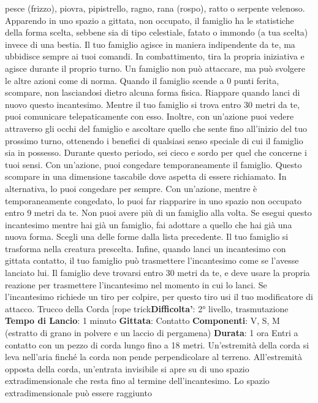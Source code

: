\begin{multicols}{2}
pesce (frizzo), piovra, pipistrello, ragno, rana (rospo),
ratto o serpente velenoso. Apparendo in uno spazio a
gittata, non occupato, il famiglio ha le statistiche della
forma scelta, sebbene sia di tipo celestiale, fatato o
immondo (a tua scelta) invece di una bestia.
Il tuo famiglio agisce in maniera indipendente da te, ma
ubbidisce sempre ai tuoi comandi. In combattimento,
tira la propria iniziativa e agisce durante il proprio turno.
Un famiglio non può attaccare, ma può svolgere le altre
azioni come di norma.
Quando il famiglio scende a 0 punti ferita, scompare,
non lasciandosi dietro alcuna forma fisica. Riappare
quando lanci di nuovo questo incantesimo.
Mentre il tuo famiglio si trova entro 30 metri da te, puoi
comunicare telepaticamente con esso. Inoltre, con
un’azione puoi vedere attraverso gli occhi del famiglio e
ascoltare quello che sente fino all’inizio del tuo
prossimo turno, ottenendo i benefici di qualsiasi senso
speciale di cui il famiglio sia in possesso. Durante
questo periodo, sei cieco e sordo per quel che
concerne i tuoi sensi.
Con un’azione, puoi congedare temporaneamente il
famiglio. Questo scompare in una dimensione tascabile
dove aspetta di essere richiamato. In alternativa, lo puoi
congedare per sempre. Con un’azione, mentre è
temporaneamente congedato, lo puoi far riapparire in
uno spazio non occupato entro 9 metri da te.
Non puoi avere più di un famiglio alla volta. Se esegui
questo incantesimo mentre hai già un famiglio, fai
adottare a quello che hai già una nuova forma. Scegli
una delle forme dalla lista precedente. Il tuo famiglio si
trasforma nella creatura prescelta.
Infine, quando lanci un incantesimo con gittata contatto,
il tuo famiglio può trasmettere l’incantesimo come se
l’avesse lanciato lui. Il famiglio deve trovarsi entro 30
metri da te, e deve usare la propria reazione per
trasmettere l’incantesimo nel momento in cui lo lanci.
Se l’incantesimo richiede un tiro per colpire, per questo
tiro usi il tuo modificatore di attacco.
Trucco della Corda
[rope trick\textbf{Difficolta'}:
2° livello, trasmutazione
\textbf{Tempo di Lancio}: 1 minuto
\textbf{Gittata}: Contatto
\textbf{Componenti}: V, S, M (estratto di grano in polvere e un
laccio di pergamena)
\textbf{Durata}: 1 ora
Entri a contatto con un pezzo di corda lungo fino a 18
metri. Un’estremità della corda si leva nell’aria finché la
corda non pende perpendicolare al terreno.
All’estremità opposta della corda, un’entrata invisibile si
apre su di uno spazio extradimensionale che resta fino
al termine dell’incantesimo.
Lo spazio extradimensionale può essere raggiunto

\end{multicols}
